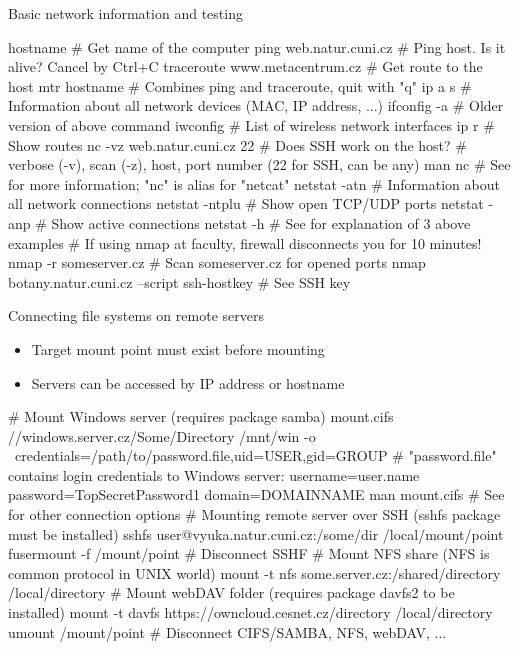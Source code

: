 \documentclass[compress, ucs, xelatex, 11pt, xcolor=svgnames,
  hyperref={
    bookmarks=true,
    unicode=true,
    colorlinks=true,
    pdftitle={Linux, command line and MetaCentrum},
    plainpages=false,
    pdfauthor={Vojtech Zeisek},
    pdfsubject={Course about use of Linux command line, writing shell scripts and using MetaCentrum of CESNET},
    pdfcreator={XeLaTeX},
    pdfkeywords={Linux, GNU, BASH, shell, command line, MetaCentrum},
    linkcolor=DarkRed,
    anchorcolor=DarkBlue,
    citecolor=Indigo,
    filecolor=NavyBlue,
    menucolor=DarkMagenta,
    urlcolor=DarkBlue,
    pdftex},
  url={hyphens, lowtilde} %
  ]{beamer}
\begin{document}
\begin{frame}[fragile]{Basic network information and testing}
  \begin{bashcode}
    hostname # Get name of the computer
    ping web.natur.cuni.cz # Ping host. Is it alive? Cancel by Ctrl+C
    traceroute www.metacentrum.cz # Get route to the host
    mtr hostname # Combines ping and traceroute, quit with "q"
    ip a s # Information about all network devices (MAC, IP address, ...)
    ifconfig -a # Older version of above command
    iwconfig # List of wireless network interfaces
    ip r # Show routes
    nc -vz web.natur.cuni.cz 22 # Does SSH work on the host?
      # verbose (-v), scan (-z), host, port number (22 for SSH, can be any)
    man nc # See for more information; "nc" is alias for "netcat"
    netstat -atn # Information about all network connections
    netstat -ntplu # Show open TCP/UDP ports
    netstat -anp # Show active connections
    netstat -h # See for explanation of 3 above examples
    # If using nmap at faculty, firewall disconnects you for 10 minutes!
    nmap -r someserver.cz # Scan someserver.cz for opened ports
    nmap botany.natur.cuni.cz --script ssh-hostkey # See SSH key
  \end{bashcode}
\end{frame}

\begin{frame}[fragile]{Connecting file systems on remote servers}
  \label{netfs}
  \begin{itemize}
    \item Target mount point must exist before mounting
    \item Servers can be accessed by IP address or hostname
  \end{itemize}
  \begin{bashcode}
    # Mount Windows server (requires package samba)
    mount.cifs //windows.server.cz/Some/Directory /mnt/win -o \
      credentials=/path/to/password.file,uid=USER,gid=GROUP
    # "password.file" contains login credentials to Windows server:
    username=user.name
    password=TopSecretPassword1
    domain=DOMAINNAME
    man mount.cifs # See for other connection options
    # Mounting remote server over SSH (sshfs package must be installed)
    sshfs user@vyuka.natur.cuni.cz:/some/dir /local/mount/point
    fusermount -f /mount/point # Disconnect SSHF
    # Mount NFS share (NFS is common protocol in UNIX world)
    mount -t nfs some.server.cz:/shared/directory /local/directory
    # Mount webDAV folder (requires package davfs2 to be installed)
    mount -t davfs https://owncloud.cesnet.cz/directory /local/directory
    umount /mount/point # Disconnect CIFS/SAMBA, NFS, webDAV, ...
  \end{bashcode}
\end{frame}
\end{document}
